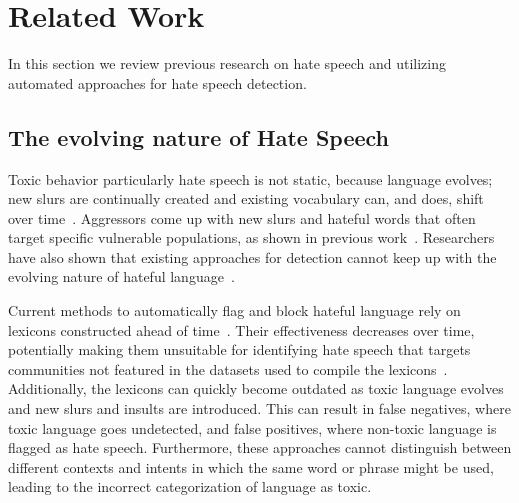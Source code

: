 \section{Related Work}
In this section we review previous research on hate speech and utilizing automated approaches for hate speech detection.

\subsection{The evolving nature of Hate Speech}

Toxic behavior particularly hate speech is not static, because language evolves; new slurs are continually created and existing vocabulary can, and does, shift over time~\cite{kulkarni2015statistically}.
Aggressors come up with new slurs and hateful words that often target specific vulnerable populations, as shown in previous work~\cite{davidson2017automated,fortuna2018survey}. Researchers have also shown that existing approaches for detection cannot keep up with the evolving nature of hateful language~\cite{tahmasbi2021go}.

Current methods to automatically flag and block hateful language rely on lexicons constructed ahead of time~\cite{burnap2015cyber,founta2018large}.
Their effectiveness decreases over time, potentially making them unsuitable for identifying hate speech that targets communities not featured in the datasets used to compile the lexicons~\cite {waseem2016hateful,nobata2016abusive}. Additionally, the lexicons can quickly become outdated as toxic language evolves and new slurs and insults are introduced.
This can result in false negatives, where toxic language goes undetected, and false positives, where non-toxic language is flagged as hate speech.
Furthermore, these approaches cannot distinguish between different contexts and intents in which the same word or phrase might be used, leading to the incorrect categorization of language as toxic. 

